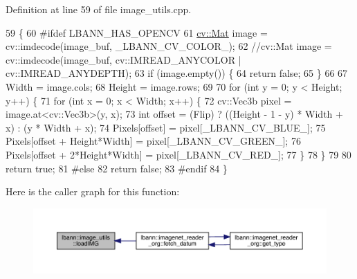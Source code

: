 Definition at line 59 of file image\+\_\+utils.\+cpp.


\begin{DoxyCode}
59                                                                                                            
                         \{
60 \textcolor{preprocessor}{#ifdef LBANN\_HAS\_OPENCV}
61   \hyperlink{base_8hpp_a68f11fdc31b62516cb310831bbe54d73}{cv::Mat} image = cv::imdecode(image\_buf, \_LBANN\_CV\_COLOR\_);
62   \textcolor{comment}{//cv::Mat image = cv::imdecode(image\_buf, cv::IMREAD\_ANYCOLOR | cv::IMREAD\_ANYDEPTH);}
63   \textcolor{keywordflow}{if} (image.empty()) \{
64     \textcolor{keywordflow}{return} \textcolor{keyword}{false};
65   \}
66 
67   Width = image.cols;
68   Height = image.rows;
69 
70   \textcolor{keywordflow}{for} (\textcolor{keywordtype}{int} y = 0; y < Height; y++) \{
71     \textcolor{keywordflow}{for} (\textcolor{keywordtype}{int} x = 0; x < Width; x++) \{
72       cv::Vec3b pixel = image.at<cv::Vec3b>(y, x);
73       \textcolor{keywordtype}{int} offset = (Flip) ? ((Height - 1 - y) * Width + x) : (y * Width + x);
74       Pixels[offset]                  = pixel[\_LBANN\_CV\_BLUE\_];
75       Pixels[offset + Height*Width]   = pixel[\_LBANN\_CV\_GREEN\_];
76       Pixels[offset + 2*Height*Width] = pixel[\_LBANN\_CV\_RED\_];
77     \}
78   \}
79 
80   \textcolor{keywordflow}{return} \textcolor{keyword}{true};
81 \textcolor{preprocessor}{#else}
82   \textcolor{keywordflow}{return} \textcolor{keyword}{false};
83 \textcolor{preprocessor}{#endif}
84 \}
\end{DoxyCode}
Here is the caller graph for this function\+:\nopagebreak
\begin{figure}[H]
\begin{center}
\leavevmode
\includegraphics[width=350pt]{classlbann_1_1image__utils_a6043097a96cf246ac1b63053ed15962b_icgraph}
\end{center}
\end{figure}
\mbox{\label{classlbann_1_1image__utils_a0ed89f3bc964aec90799ace32bf788e4}} 
